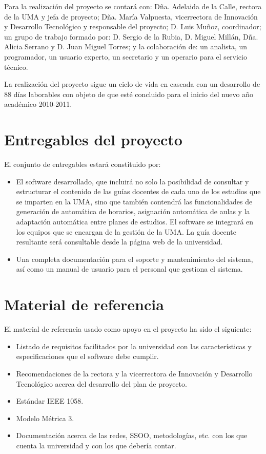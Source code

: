 \documentclass[11pt,a4paper,spanish,twoside]{report}
\begin{document}
Para la realización del proyecto se contará con: Dña. Adelaida de la Calle, 
rectora de la UMA y jefa de proyecto; Dña. María Valpuesta, vicerrectora de 
Innovación y Desarrollo Tecnológico y responsable del proyecto; D. Luis 
Muñoz, coordinador; un grupo de trabajo formado por: D. Sergio de la Rubia, 
D. Miguel Millán, Dña. Alicia Serrano y D. Juan Miguel Torres; y la 
colaboración de: un analista, un programador, un usuario experto, un 
secretario y un operario para el servicio técnico.

La realización del proyecto sigue un ciclo de vida en cascada con un 
desarrollo de 88 días laborables con objeto de que esté concluido para el 
inicio del nuevo año académico 2010-2011.

\section{Entregables del proyecto}
El conjunto de entregables estará constituido por:
\begin{itemize}
\item El software desarrollado, que incluirá no solo la posibilidad de
  consultar y estructurar el contenido de las guías docentes de cada uno de
  los estudios que se imparten en la UMA, sino que también contendrá las
  funcionalidades de generación de automática de horarios, asignación
  automática de aulas y la adaptación automática entre planes de estudios. El
  software se integrará en los equipos que se encargan de la gestión de la
  UMA. La guía docente resultante será consultable desde la página web de la
  universidad.
\item Una completa documentación para el soporte y mantenimiento del sistema,
  así como un manual de usuario para el personal que gestiona el sistema. 
\end{itemize}

\section{Material de referencia}
El material de referencia usado como apoyo en el proyecto ha sido el siguiente:
\begin{itemize}
\item Listado de requisitos facilitados por la universidad con las 
  características y especificaciones que el software debe cumplir.
\item Recomendaciones de la rectora y la vicerrectora de Innovación y 
  Desarrollo Tecnológico acerca del desarrollo del plan de proyecto.
\item Estándar IEEE 1058.
\item Modelo Métrica 3.
\item Documentación acerca de las redes, SSOO, metodologías, etc. con los que 
  cuenta la universidad y con los que debería contar.
\end{itemize}
\end{document}
